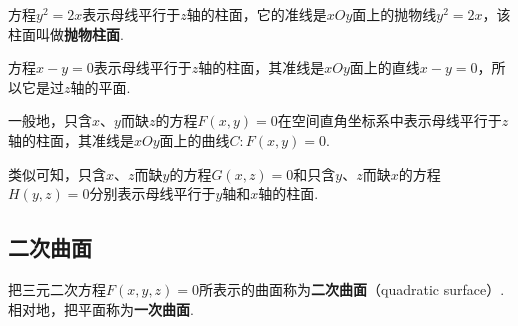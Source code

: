 \begin{example}
方程\(y^2=2x\)表示母线平行于\(z\)轴的柱面，它的准线是\(xOy\)面上的抛物线\(y^2=2x\)，该柱面叫做\textbf{抛物柱面}.
\end{example}

\begin{example}
方程\(x-y=0\)表示母线平行于\(z\)轴的柱面，其准线是\(xOy\)面上的直线\(x-y=0\)，所以它是过\(z\)轴的平面.
\end{example}

一般地，只含\(x\)、\(y\)而缺\(z\)的方程\(F(x,y)=0\)在空间直角坐标系中表示母线平行于\(z\)轴的柱面，其准线是\(xOy\)面上的曲线\(C: F(x,y)=0\).

类似可知，只含\(x\)、\(z\)而缺\(y\)的方程\(G(x,z)=0\)和只含\(y\)、\(z\)而缺\(x\)的方程\(H(y,z)=0\)分别表示母线平行于\(y\)轴和\(x\)轴的柱面.

\subsection{二次曲面}
\begin{definition}
把三元二次方程\(F(x,y,z)=0\)所表示的曲面称为\textbf{二次曲面}（quadratic surface）.
相对地，把平面称为\textbf{一次曲面}.
\end{definition}

